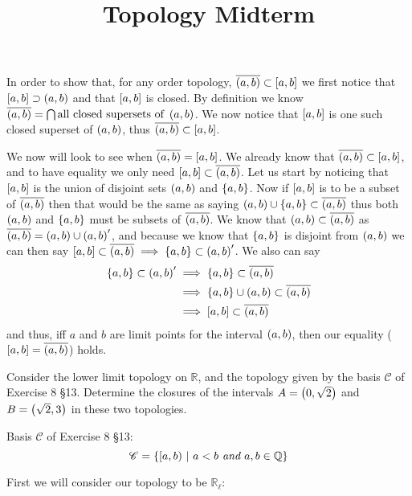 \documentclass{article}
\title{Topology Midterm}
\begin{document}
\maketitle

In  order to show that, for any order topology, $\overline{\left( {a} , {b} \right)} \subset \left[ {a} , {b} \right]$ we first notice that $\left[ {a} , {b} \right] \supset \left( {a} , {b} \right)$ and that $\left[ {a} , {b} \right]$ is closed. By definition we know $\overline{\left( {a} , {b} \right)} = \bigcap \text{all closed supersets of }\left( {a} , {b} \right)$. We now notice that $\left[ {a} , {b} \right]$ is one such closed superset of $\left( {a} , {b} \right)$, thus $\overline{\left( {a} , {b} \right)} \subset \left[ {a} , {b} \right]$.

We now will look to see when $\overline{\left( {a} , {b} \right)} = \left[ {a} , {b} \right]$. We already know that $\overline{\left( {a} , {b} \right)} \subset \left[ {a} , {b} \right]$, and to have equality we only need $\left[ {a} , {b} \right] \subset \overline{\left( {a} , {b} \right)}$. Let us start by noticing that $\left[ {a} , {b} \right]$ is the union of disjoint sets $\left( {a} , {b} \right)$ and $\left\{ {a,b} \right\}$. Now if $\left[ {a} , {b} \right]$ is to be a subset of $\overline{\left( {a} , {b} \right)}$ then that would be the same as saying $\left( {a} , {b} \right)\cup\left\{ {a,b} \right\}\subset\overline{\left( {a} , {b} \right)}$ thus both $\left( {a} , {b} \right)$ and $\left\{ {a,b} \right\}$ must be subsets of $\overline{\left( {a} , {b} \right)}$. We know that $\left( {a} , {b} \right)\subset\overline{\left( {a} , {b} \right)}$ as $\overline{\left( {a} , {b} \right)} = \left( {a} , {b} \right) \cup {\left( {a} , {b} \right)} '$, and because we know that $\left\{ {a,b} \right\}$ is disjoint from $\left( {a} , {b} \right)$ we can then say $\left[ {a} , {b} \right] \subset \overline{\left( {a} , {b} \right)} \implies \left\{ {a,b} \right\} \subset {\left( {a} , {b} \right)} '$. We also can say
\begin{align*}
\left\{ {a,b} \right\} \subset {\left( {a} , {b} \right)} ' &\implies \left\{ {a,b} \right\} \subset \overline{\left( {a} , {b} \right)} \\
&\implies \left\{ {a,b} \right\} \cup \left( {a} , {b} \right) \subset \overline{\left( {a} , {b} \right)} \\
&\implies \left[ {a} , {b} \right] \subset \overline{\left( {a} , {b} \right)}
\end{align*}
and thus, iff $a$ and $b$ are limit points for the interval $\left( {a} , {b} \right)$, then our equality ($\left[ {a} , {b} \right] = \overline{\left( {a} , {b} \right)}$) holds.

\bigskip

Consider the lower limit topology on $\mathbb R$, and the topology given by the basis $\mathscr C$ of Exercise 8 \S 13. Determine the closures of the intervals $A = \left( {0} , {\sqrt{2}} \right)$ and $B=\left( {\sqrt2} , {3} \right)$ in these two topologies.

Basis $\mathscr C$ of Exercise 8 \S 13:\[\mathscr C = \left\{ {{\left[ {a} , {b} \right)} \ |\  {a<b \textit{ and } a,b\in\mathbb Q}} \right\}\]
\medskip

First we will consider our topology to be $\mathbb R_{\ell}$:
\smallskip
\end{document}

